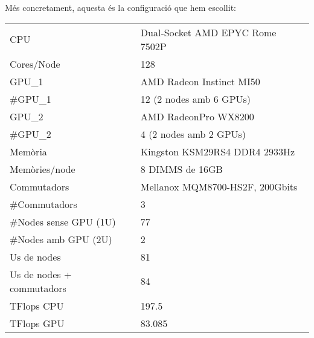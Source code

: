 Més concretament, aquesta és la configuració que hem escollit:
\begin{table}[H]
\begin{adjustwidth}{-1.0in}{-1.0in}
\begin{center}
\begin{tabular}{l|l}
\hline
{\cellcolor[HTML]{EFEFEF}CPU}         & {\cellcolor[HTML]{EFEFEF}Dual-Socket AMD EPYC Rome 7502P} \\ 
Cores/Node                                       & 128                                             \\ 
{\cellcolor[HTML]{EFEFEF}GPU\_1}                       & {\cellcolor[HTML]{EFEFEF}AMD Radeon Instinct MI50} \\ 
\#GPU\_1                                           & 12 (2 nodes amb 6 GPUs)                         \\
{\cellcolor[HTML]{EFEFEF}GPU\_2}                       & {\cellcolor[HTML]{EFEFEF}AMD RadeonPro WX8200} \\ 
\#GPU\_2                                           & 4 (2 nodes amb 2 GPUs)                         \\
{\cellcolor[HTML]{EFEFEF}Memòria}     & {\cellcolor[HTML]{EFEFEF}Kingston KSM29RS4 DDR4 2933Hz}   \\
{\color[HTML]{000000}Memòries/node}             & {\color[HTML]{000000}8 DIMMS de 16GB}          \\ 
{\cellcolor[HTML]{EFEFEF}Commutadors} & {\cellcolor[HTML]{EFEFEF}Mellanox MQM8700-HS2F, 200Gbits} \\ 
{\color[HTML]{000000}\#Commutadors}             & {\color[HTML]{000000}3}                        \\ 
{\cellcolor[HTML]{EFEFEF}\#Nodes sense GPU (1U)}    & {\cellcolor[HTML]{EFEFEF}77}                       \\
{\color[HTML]{000000}\#Nodes amb GPU (2U)}      & {\color[HTML]{000000}2}                        \\
{\cellcolor[HTML]{EFEFEF}Us de nodes}               & {\cellcolor[HTML]{EFEFEF}81}                       \\
{\color[HTML]{000000}Us de nodes + commutadors} & {\color[HTML]{000000}84}                       \\
{\cellcolor[HTML]{EFEFEF}TFlops CPU}                & {\cellcolor[HTML]{EFEFEF}197.5}                    \\
{\color[HTML]{000000}TFlops GPU}                & {\color[HTML]{000000}83.085}                    \\ 

\end{tabular}
\end{center}
\end{adjustwidth}
\end{table}
